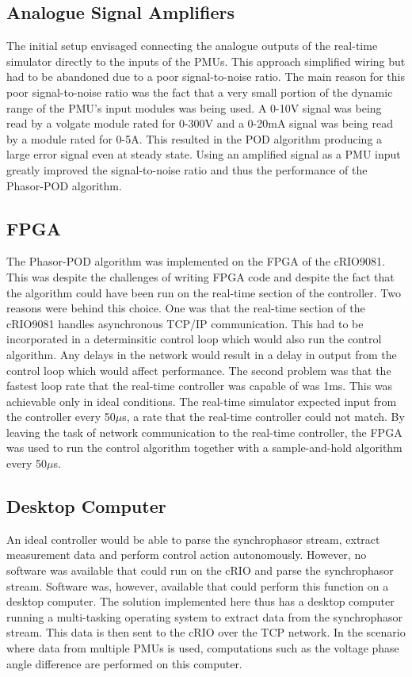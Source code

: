 \documentclass[conference]{IEEEtran}
\begin{document}
\subsection{Analogue Signal Amplifiers} The initial setup envisaged connecting the analogue outputs of the real-time simulator directly to the inputs of the PMUs. This approach simplified wiring but had to be abandoned due to a poor signal-to-noise ratio. The main reason for this poor signal-to-noise ratio was the fact that a very small portion of the dynamic range of the PMU's input modules was being used. A 0-10V signal was being read by a volgate module rated for 0-300V and a 0-20mA signal was being read by a module rated for 0-5A. This resulted in the POD algorithm producing a large error signal even at steady state. Using an amplified signal as a PMU input greatly improved the signal-to-noise ratio and thus the performance of the Phasor-POD algorithm.

\subsection{FPGA} The Phasor-POD algorithm was implemented on the FPGA of the cRIO9081. This was despite the challenges of writing FPGA code and despite the fact that the algorithm could have been run on the real-time section of the controller. Two reasons were behind this choice. One was that the real-time section of the cRIO9081 handles asynchronous TCP/IP communication. This had to be incorporated in a determinsitic control loop which would also run the control algorithm. Any delays in the network would result in a delay in output from the control loop which would affect performance. The second problem was that the fastest loop rate that the real-time controller was capable of was 1ms. This was achievable only in ideal conditions. The real-time simulator expected input from the controller every 50$\mu$s, a rate that the real-time controller could not match. By leaving the task of network communication to the real-time controller, the FPGA was used to run the control algorithm together with a sample-and-hold algorithm every 50$\mu$s.

\subsection{Desktop Computer} An ideal controller would be able to parse the synchrophasor stream, extract measurement data and perform control action autonomously. However, no software was available that could run on the cRIO and parse the synchrophasor stream. Software \cite{SDK} was, however, available that could perform this function on a desktop computer. The solution implemented here thus has a desktop computer running a multi-tasking operating system to extract data from the synchrophasor stream. This data is then sent to the cRIO over the TCP network. In the scenario where data from multiple PMUs is used, computations such as the voltage phase angle difference are performed on this computer.
\end{document}
